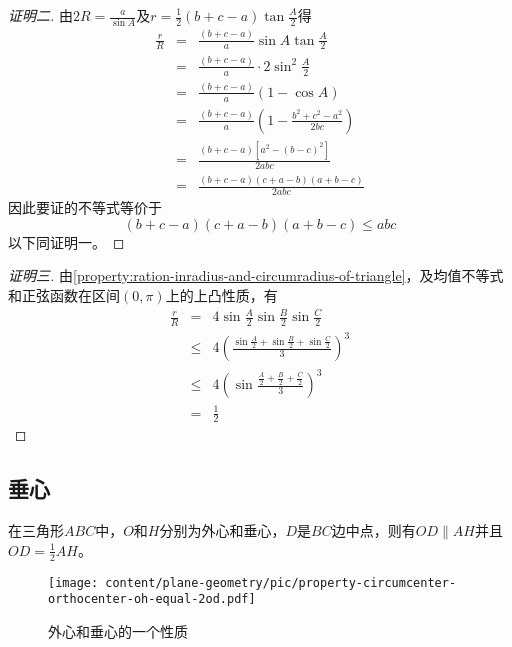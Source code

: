 \begin{proof}[证明二]
  由$2R=\frac{a}{\sin{A}}$及$r=\frac{1}{2}(b+c-a)\tan{\frac{A}{2}}$得
  \begin{eqnarray*}
    \frac{r}{R} & = & \frac{(b+c-a)}{a}\sin{A}\tan{\frac{A}{2}} \\
                & = & \frac{(b+c-a)}{a} \cdot 2\sin^2{\frac{A}{2}} \\
                & = & \frac{(b+c-a)}{a} (1-\cos{A}) \\
                & = & \frac{(b+c-a)}{a} \left( 1-\frac{b^2+c^2-a^2}{2bc} \right) \\
                & = & \frac{(b+c-a)[a^2-(b-c)^2]}{2abc} \\
    & = & \frac{(b+c-a)(c+a-b)(a+b-c)}{2abc}
  \end{eqnarray*}
  因此要证的不等式等价于
  \[
    (b+c-a)(c+a-b)(a+b-c) \leqslant abc
  \]
  以下同证明一。
\end{proof}

\begin{proof}[证明三]
  由\autoref{property:ration-inradius-and-circumradius-of-triangle}，及均值不等式和正弦函数在区间$(0,\pi)$上的上凸性质，有
  \begin{eqnarray*}
    \frac{r}{R} & = & 4\sin{\frac{A}{2}}\sin{\frac{B}{2}}\sin{\frac{C}{2}} \\
                & \leqslant & 4 \left( \frac{\sin{\frac{A}{2}}+\sin{\frac{B}{2}}+\sin{\frac{C}{2}}}{3} \right)^3 \\
                & \leqslant & 4 \left( \sin{\frac{\frac{A}{2}+\frac{B}{2}+\frac{C}{2}}{3}} \right)^3 \\
    & = & \frac{1}{2}
  \end{eqnarray*}
\end{proof}

\subsection{垂心}
\label{sec:triangle-orthocentre}

\begin{property}
  \label{property:circumcenter-orthocenter-ah-equal-2od}
  在三角形$ABC$中，$O$和$H$分别为外心和垂心，$D$是$BC$边中点，则有$OD \parallel AH$并且$OD = \frac{1}{2} AH$。
\end{property}

\begin{figure}[htbp]
\centering
\texttt{[image: content/plane-geometry/pic/property-circumcenter-orthocenter-oh-equal-2od.pdf]}
\caption{外心和垂心的一个性质}
\label{fig:property-circumcenter-orthocenter-oh-equal-2od}
\end{figure}

